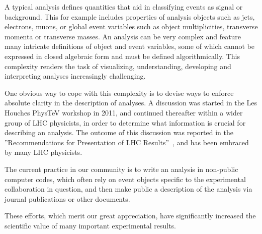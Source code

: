 \documentclass[11pt]{cernrep}
\begin{document}
A typical analysis defines quantities that aid in classifying events as signal
or background. This for example includes properties of analysis objects such as
jets, electrons, muons, or global event variables such as object multiplicities,
transverse momenta or transverse masses.
An analysis can be very complex and feature many intricate definitions of object and event
variables, some of which cannot be expressed in closed algebraic form and must be defined
algorithmically. This complexity renders the task of visualizing, understanding, developing and
interpreting analyses increasingly challenging.

One obvious way to cope with this complexity is to devise ways to enforce absolute clarity in the description of analyses.
A discussion was started in the Les Houches PhysTeV workshop in 2011, and continued
thereafter within a wider group of LHC physicists, in order to determine what information is
crucial for describing an analysis. The outcome of this discussion was reported in the
''Recommendations for Presentation of LHC Results''~\cite{Brooijmans:2012yi,Kraml:2012sg,Brooijmans:2016vro}, and has been embraced by many LHC physicists.

The current practice in our community is to write an analysis in non-public computer codes,
which often rely on event objects specific to the experimental collaboration in question,
and then make public a description of the analysis via journal publications or other documents.

These efforts, which merit our great appreciation,
have significantly increased the scientific value of many important experimental results.
\end{document}
